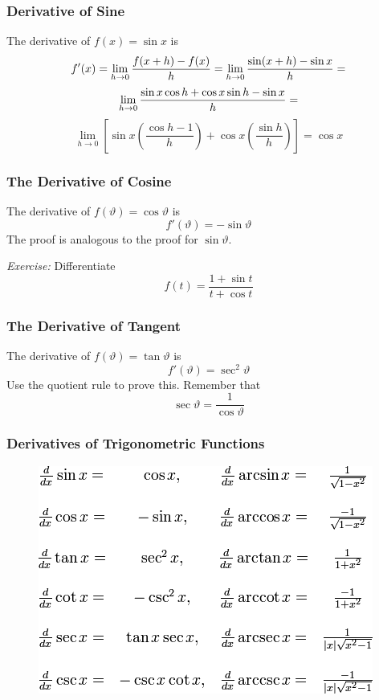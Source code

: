 \documentclass[xcolor=dvipsnames]{beamer}
\begin{document}
\begin{frame}
  \frametitle{Derivative of Sine}
  The derivative of $f(x)=\sin{}x$ is 
\begin{equation}
  \label{eq:eishooro}
  f'(x)=\lim_{h\rightarrow{}0}\frac{f(x+h)-f(x)}{h}=\lim_{h\rightarrow{}0}\frac{\sin(x+h)-\sin{}x}{h}=\notag
\end{equation}
\begin{equation}
  \label{eq:phauzelo}
  \lim_{h\rightarrow{}0}\frac{\sin{}x\cos{}h+\cos{}x\sin{}h-\sin{}x}{h}=\notag
\end{equation}
\begin{equation}
  \label{eq:jiexeedo}
  \lim_{h\rightarrow{}0}\left[\sin{}x\left(\frac{\cos{}h-1}{h}\right)+\cos{}x\left(\frac{\sin{}h}{h}\right)\right]=\cos{}x
\end{equation}
\end{frame}

\begin{frame}
  \frametitle{The Derivative of Cosine}
The derivative of $f(\vartheta)=\cos\vartheta$ is 
\begin{equation}
  \label{eq:ahfiefev}
  f'(\vartheta)=-\sin\vartheta
\end{equation}
The proof is analogous to the proof for $\sin{}\vartheta$.

\emph{Exercise:} Differentiate 
\begin{equation}
  \label{eq:afeizeix}
  f(t)=\frac{1+\sin{}t}{t+\cos{}t}
\end{equation}
\end{frame}

\begin{frame}
  \frametitle{The Derivative of Tangent}
The derivative of $f(\vartheta)=\tan\vartheta$ is 
\begin{equation}
  \label{eq:uulohjeo}
  f'(\vartheta)=\sec^{2}\vartheta
\end{equation}
Use the quotient rule to prove this. Remember that 
\begin{equation}
  \label{eq:shooceid}
  \sec\vartheta=\frac{1}{\cos\vartheta}
\end{equation}
\end{frame}

\begin{frame}
  \frametitle{Derivatives of Trigonometric Functions}
\begin{figure}[h]
\includegraphics[scale=.6]{./diagrams/trigdiff.png}
\end{figure}
\end{frame}
\end{document}
